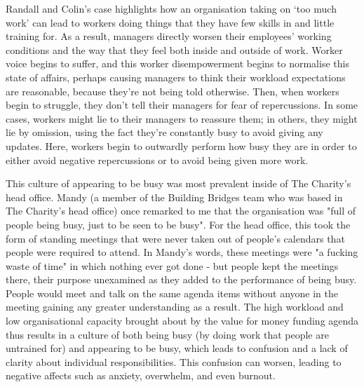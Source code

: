 Randall and Colin's case highlights how an organisation taking on `too much work' can lead to workers doing things that they have few skills in and little training for. As a result, managers directly worsen their employees' working conditions and the way that they feel both inside and outside of work. Worker voice begins to suffer, and this worker disempowerment begins to normalise this state of affairs, perhaps causing managers to think their workload expectations are reasonable, because they're not being told otherwise. Then, when workers begin to struggle, they don't tell their managers for fear of repercussions. In some cases, workers might lie to their managers to reassure them; in others, they might lie by omission, using the fact they're constantly busy to avoid giving any updates. Here, workers begin to outwardly perform how busy they are in order to either avoid negative repercussions or to avoid being given more work. 

This culture of appearing to be busy was most prevalent inside of The Charity’s head office. Mandy (a member of the Building Bridges team who was based in The Charity's head office) once remarked to me that the organisation was "full of people being busy, just to be seen to be busy". For the head office, this took the form of standing meetings that were never taken out of people's calendars that people were required to attend. In Mandy's words, these meetings were "a fucking waste of time" in which nothing ever got done - but people kept the meetings there, their purpose unexamined as they added to the performance of being busy. People would meet and talk on the same agenda items without anyone in the meeting gaining any greater understanding as a result. The high workload and low organisational capacity brought about by the value for money funding agenda thus results in a culture of both being busy (by doing work that people are untrained for) and appearing to be busy, which leads to confusion and a lack of clarity about individual responsibilities. This confusion can worsen, leading to negative affects such as anxiety, overwhelm, and even burnout. 

